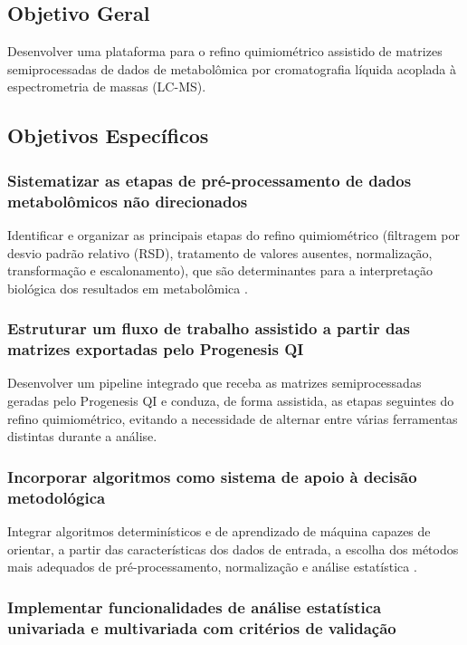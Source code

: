 \subsection{Objetivo Geral}

Desenvolver uma plataforma para o refino quimiométrico assistido de matrizes semiprocessadas de dados de metabolômica por cromatografia líquida acoplada à espectrometria de massas (LC-MS).

\subsection{Objetivos Específicos}

\subsubsection{Sistematizar as etapas de pré-processamento de dados metabolômicos não direcionados}
 
Identificar e organizar as principais etapas do refino quimiométrico (filtragem por desvio padrão relativo (RSD), tratamento de valores ausentes, normalização, transformação e escalonamento), que são determinantes para a interpretação biológica dos resultados em metabolômica \cite{vandenberg2006centering}.



\subsubsection{Estruturar um fluxo de trabalho assistido a partir das matrizes exportadas pelo Progenesis QI}
 
Desenvolver um pipeline integrado que receba as matrizes semiprocessadas geradas pelo Progenesis QI e conduza, de forma assistida, as etapas seguintes do refino quimiométrico, evitando a necessidade de alternar entre várias ferramentas distintas durante a análise.
 

\subsubsection{Incorporar algoritmos como sistema de apoio à decisão metodológica}
 
Integrar algoritmos determinísticos e de aprendizado de máquina capazes de orientar, a partir das características dos dados de entrada, a escolha dos métodos mais adequados de pré-processamento, normalização e análise estatística \cite{galal2022applications}.


\subsubsection{Implementar funcionalidades de análise estatística univariada e multivariada com critérios de validação}
 
